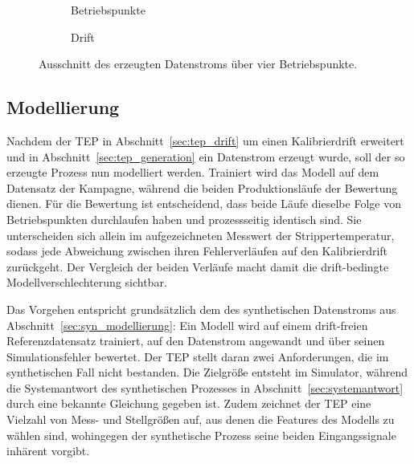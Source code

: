 %
\begin{figure}[tbp]
    \centering
    \begin{subfigure}[t]{\textwidth}
        \centering
        
        \caption{Betriebspunkte}
        \label{fig:tep_stream_point}
    \end{subfigure}

    \begin{subfigure}[t]{\textwidth}
        \centering
        
        \caption{Drift}
        \label{fig:tep_stream_drift}
    \end{subfigure}

    \caption{Ausschnitt des erzeugten Datenstroms über vier Betriebspunkte.}
    \label{fig:tep_stream}
\end{figure}
%
\subsection{Modellierung} \label{sec:tep_modellierung}
%

%
Nachdem der \ac{TEP} in Abschnitt~\ref{sec:tep_drift} um einen Kalibrierdrift erweitert und in Abschnitt~\ref{sec:tep_generation} ein Datenstrom erzeugt wurde, soll der so erzeugte Prozess nun modelliert werden. Trainiert wird das Modell auf dem Datensatz der Kampagne, während die beiden Produktionsläufe der Bewertung dienen. Für die Bewertung ist entscheidend, dass beide Läufe dieselbe Folge von Betriebspunkten durchlaufen haben und prozessseitig identisch sind. Sie unterscheiden sich allein im aufgezeichneten Messwert der Strippertemperatur, sodass jede Abweichung zwischen ihren Fehlerverläufen auf den Kalibrierdrift zurückgeht. Der Vergleich der beiden Verläufe macht damit die drift-bedingte Modellverschlechterung sichtbar. \par
%
Das Vorgehen entspricht grundsätzlich dem des synthetischen Datenstroms aus Abschnitt~\ref{sec:syn_modellierung}: Ein Modell wird auf einem drift-freien Referenzdatensatz trainiert, auf den Datenstrom angewandt und über seinen Simulationsfehler bewertet. Der \ac{TEP} stellt daran zwei Anforderungen, die im synthetischen Fall nicht bestanden. Die Zielgröße entsteht im Simulator, während die Systemantwort des synthetischen Prozesses in Abschnitt~\ref{sec:systemantwort} durch eine bekannte Gleichung gegeben ist. Zudem zeichnet der \ac{TEP} eine Vielzahl von Mess- und Stellgrößen auf, aus denen die Features des Modells zu wählen sind, wohingegen der synthetische Prozess seine beiden Eingangssignale inhärent vorgibt. \par
